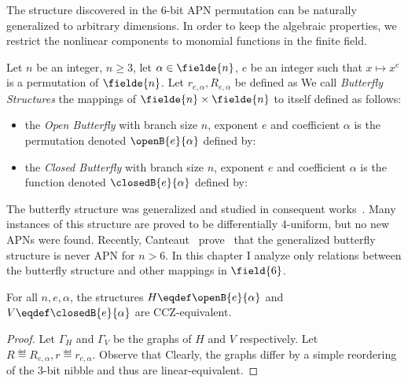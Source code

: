
The structure discovered in the 6-bit APN permutation can be naturally generalized to arbitrary dimensions. In order to keep the algebraic properties, we restrict the nonlinear components to monomial functions in the finite field. 

\begin{definition}
  Let $n$ be an integer, $n \ge 3$, let $\alpha \in \fielde{n}$, $e$ be an integer such that $x \mapsto x^e$ is a permutation of $\fielde{n}$.
  Let $r_{e,\alpha},R_{e,\alpha}$ be defined as
  We call \emph{Butterfly Structures} the mappings of $\fielde{n} \times \fielde{n}$ to itself defined as follows:
  \begin{itemize}
      \item the \emph{Open Butterfly} with branch size $n$, exponent $e$ and coefficient $\alpha$ is the permutation denoted $\openB{e}{\alpha}$ defined by:
      \item the \emph{Closed Butterfly} with branch size $n$, exponent $e$ and coefficient $\alpha$ is the function denoted $\closedB{e}{\alpha}$ defined by:
  \end{itemize}
\end{definition}

The butterfly structure was generalized and studied in consequent works~\cite{BflyGeneralized1,BflyGeneralized2,BflyGeneralized3}. Many instances of this structure are proved to be differentially 4-uniform, but no new APNs were found. Recently, Canteaut~\etal{} prove~\cite{BflyGeneralized9} that the generalized butterfly structure is never APN for $n > 6$. In this chapter I analyze only relations between the butterfly structure and other mappings in $\field{6}$.

\begin{proposition}
For all $n,e,\alpha$, the structures $H\eqdef \openB{e}{\alpha}$ and $V \eqdef \closedB{e}{\alpha}$ are CCZ-equivalent.
\end{proposition}
\begin{proof}
Let $\Gamma_H$ and $\Gamma_V$ be the graphs of $H$ and $V$ respectively. Let $R \eqdef R_{e,\alpha}, r \eqdef r_{e,\alpha}$. Observe that
Clearly, the graphs differ by a simple reordering of the 3-bit nibble and thus are linear-equivalent.
\end{proof}



